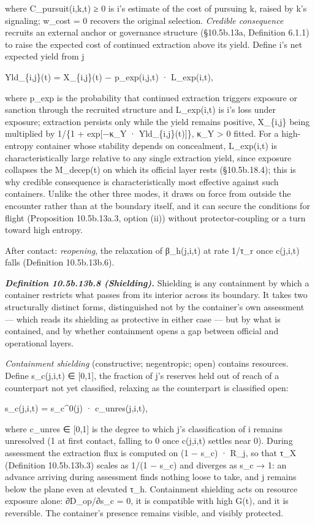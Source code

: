 \documentclass[
]{article}
\begin{document}
where C\_pursuit(i,k,t) ≥ 0 is i's estimate of the cost of pursuing k,
raised by k's signaling; w\_cost = 0 recovers the original selection.
\emph{Credible consequence} recruits an external anchor or governance
structure (§10.5b.13a, Definition 6.1.1) to raise the expected cost of
continued extraction above its yield. Define i's net expected yield from
j

Yld\_\{i,j\}(t) = X\_\{i,j\}(t) − p\_exp(i,j,t) · L\_exp(i,t),

where p\_exp is the probability that continued extraction triggers
exposure or sanction through the recruited structure and L\_exp(i,t) is
i's loss under exposure; extraction persists only while the yield
remains positive, X\_\{i,j\} being multiplied by 1/\{1 + exp{[}−κ\_Y ·
Yld\_\{i,j\}(t){]}\}, κ\_Y \textgreater{} 0 fitted. For a high-entropy
container whose stability depends on concealment, L\_exp(i,t) is
characteristically large relative to any single extraction yield, since
exposure collapses the M\_decep(t) on which its official layer rests
(§10.5b.18.4); this is why credible consequence is characteristically
most effective against such containers. Unlike the other three modes, it
draws on force from outside the encounter rather than at the boundary
itself, and it can secure the conditions for flight (Proposition
10.5b.13a.3, option (ii)) without protector-coupling or a turn toward
high entropy.

After contact: \emph{reopening}, the relaxation of β\_h(j,i,t) at rate
1/τ\_r once c(j,i,t) falls (Definition 10.5b.13b.6).

\emph{\textbf{Definition 10.5b.13b.8 (Shielding).}} Shielding is any
containment by which a container restricts what passes from its interior
across its boundary. It takes two structurally distinct forms,
distinguished not by the container's own assessment --- which reads its
shielding as protective in either case --- but by what is contained, and
by whether containment opens a gap between official and operational
layers.

\emph{Containment shielding} (constructive; negentropic; open) contains
resources. Define s\_c(j,i,t) ∈ {[}0,1{]}, the fraction of j's reserves
held out of reach of a counterpart not yet classified, relaxing as the
counterpart is classified open:

s\_c(j,i,t) = s\_c\^{}0(j) · c\_unres(j,i,t),

where c\_unres ∈ {[}0,1{]} is the degree to which j's classification of i
remains unresolved (1 at first contact, falling to 0 once c(j,i,t)
settles near 0). During assessment the extraction flux is computed on
(1 − s\_c) · R\_j, so that τ\_X (Definition 10.5b.13b.3) scales as
1/(1 − s\_c) and diverges as s\_c → 1: an advance arriving during
assessment finds nothing loose to take, and j remains below the plane
even at elevated τ\_h. Containment shielding acts on resource exposure
alone: ∂D\_op/∂s\_c = 0, it is compatible with high G(t), and it is
reversible. The container's presence remains visible, and visibly
protected.
\end{document}
